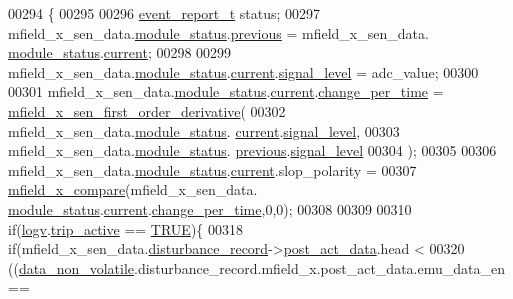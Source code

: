 \begin{DoxyCode}
00294 \{
00295 
00296     \hyperlink{a00021_d6/d66/a00441}{event\_report\_t} status;
00297     mfield\_x\_sen\_data.\hyperlink{a00025_adfab5a5d8b45a93dfb13edb24e2b80e3}{module\_status}.\hyperlink{a00019_adcb859b2f3983a9c58deab28e59c333f}{previous} = mfield\_x\_sen\_data.
      \hyperlink{a00025_adfab5a5d8b45a93dfb13edb24e2b80e3}{module\_status}.\hyperlink{a00019_acf41ffc11da291c2f9f0fcb02ee72b98}{current};
00298 
00299     mfield\_x\_sen\_data.\hyperlink{a00025_adfab5a5d8b45a93dfb13edb24e2b80e3}{module\_status}.\hyperlink{a00019_acf41ffc11da291c2f9f0fcb02ee72b98}{current}.\hyperlink{a00019_a4070db8eab0ff93e3fbc1df59872f117}{signal\_level} = adc\_value;
00300 
00301     mfield\_x\_sen\_data.\hyperlink{a00025_adfab5a5d8b45a93dfb13edb24e2b80e3}{module\_status}.\hyperlink{a00019_acf41ffc11da291c2f9f0fcb02ee72b98}{current}.\hyperlink{a00019_a0f645dd76b41adc6a966feba8e4bff8c}{change\_per\_time} = 
      \hyperlink{a00052_af29e981d0d6b3a84d980170b43933dbc}{mfield\_x\_sen\_first\_order\_derivative}(
00302                                             mfield\_x\_sen\_data.\hyperlink{a00025_adfab5a5d8b45a93dfb13edb24e2b80e3}{module\_status}.
      \hyperlink{a00019_acf41ffc11da291c2f9f0fcb02ee72b98}{current}.\hyperlink{a00019_a4070db8eab0ff93e3fbc1df59872f117}{signal\_level},
00303                                             mfield\_x\_sen\_data.\hyperlink{a00025_adfab5a5d8b45a93dfb13edb24e2b80e3}{module\_status}.
      \hyperlink{a00019_adcb859b2f3983a9c58deab28e59c333f}{previous}.\hyperlink{a00019_a4070db8eab0ff93e3fbc1df59872f117}{signal\_level}
00304                                             );
00305 
00306     mfield\_x\_sen\_data.\hyperlink{a00025_adfab5a5d8b45a93dfb13edb24e2b80e3}{module\_status}.\hyperlink{a00019_acf41ffc11da291c2f9f0fcb02ee72b98}{current}.slop\_polarity =
00307                  \hyperlink{a00052_adf290c10214480d55f3631c1760188b0}{mfield\_x\_compare}(mfield\_x\_sen\_data.
      \hyperlink{a00025_adfab5a5d8b45a93dfb13edb24e2b80e3}{module\_status}.\hyperlink{a00019_acf41ffc11da291c2f9f0fcb02ee72b98}{current}.\hyperlink{a00019_a0f645dd76b41adc6a966feba8e4bff8c}{change\_per\_time},0,0);
00308 
00309 
00310     \textcolor{keywordflow}{if}(\hyperlink{a00021_a2e89c46668b39a17753c238950c9e1ec}{logv}.\hyperlink{a00021_a32ebd32977bc9831cd68530b2b7ec664}{trip\_active} == \hyperlink{a00040_aa8cecfc5c5c054d2875c03e77b7be15d}{TRUE})\{
00318       \textcolor{keywordflow}{if}(mfield\_x\_sen\_data.\hyperlink{a00025_ac9b38e2c1d3f1013a88d33506c754152}{disturbance\_record}->\hyperlink{a00028_a9c699c0cc82d0baa6e49195f185ab34f}{post\_act\_data}.head <
00320         ((\hyperlink{a00060_a76ac5f917f5308dcd83de0d7c94559fb}{data\_non\_volatile}.disturbance\_record.mfield\_x.post\_act\_data.emu\_data\_en==

\end{DoxyCode}
